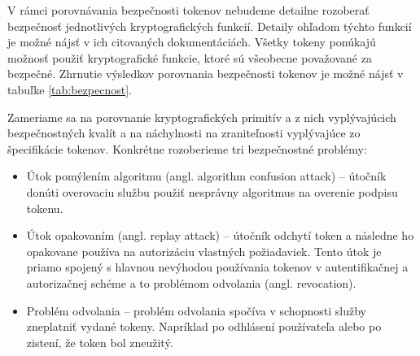 V rámci porovnávania bezpečnosti tokenov nebudeme detailne rozoberať bezpečnosť jednotlivých kryptografických funkcií. Detaily ohľadom týchto funkcií je možné nájsť v ich citovaných dokumentáciách. Všetky tokeny ponúkajú možnosť použiť kryptografické funkcie, ktoré sú všeobecne považované za bezpečné. Zhrnutie výsledkov porovnania bezpečnosti tokenov je možné nájsť v tabuľke \ref{tab:bezpecnost}.

Zameriame sa na porovnanie kryptografických primitív a z nich vyplývajúcich bezpečnostných kvalít a na náchylnosti na zraniteľnosti vyplývajúce zo špecifikácie tokenov. Konkrétne rozoberieme tri bezpečnostné problémy:


\begin{itemize}
  \item Útok pomýlením algoritmu (angl. algorithm confusion attack) -- útočník donúti overovaciu službu použiť nesprávny algoritmus na overenie podpisu tokenu. 
  \item Útok opakovaním (angl. replay attack) -- útočník odchytí token a následne ho opakovane používa na autorizáciu vlastných požiadaviek. Tento útok je priamo spojený s hlavnou nevýhodou používania tokenov v autentifikačnej a autorizačnej schéme a to problémom odvolania (angl. revocation).
  \item Problém odvolania -- problém odvolania spočíva v schopnosti služby zneplatniť vydané tokeny. Napríklad po odhlásení používateľa alebo po zistení, že token bol zneužitý.
\end{itemize}

